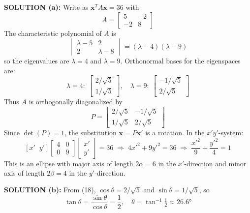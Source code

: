 \documentclass{article}
\begin{document}
\textbf{SOLUTION (a):} Write as $\mathbf{x}^T A\mathbf{x}=36$ with
\[
  A=\begin{bmatrix}5&-2\\-2&8\end{bmatrix}
\]
The characteristic polynomial of $A$ is
\[
  \begin{vmatrix}\lambda-5&2\\2&\lambda-8\end{vmatrix}=(\lambda-4)(\lambda-9)
\]
so the eigenvalues are $\lambda=4$ and $\lambda=9$. Orthonormal bases for the eigenspaces are:
\[
  \lambda=4:\;\begin{bmatrix}2/\sqrt{5}\\1/\sqrt{5}\end{bmatrix},\quad
  \lambda=9:\;\begin{bmatrix}-1/\sqrt{5}\\2/\sqrt{5}\end{bmatrix}
\]
Thus $A$ is orthogonally diagonalized by
\begin{equation}
  P=\begin{bmatrix}2/\sqrt{5}&-1/\sqrt{5}\\1/\sqrt{5}&2/\sqrt{5}\end{bmatrix} \tag{18}
\end{equation}
Since $\det(P)=1$, the substitution $\mathbf{x}=P\mathbf{x}'$ is a rotation. In the $x'y'$-system:
\[
  [x'\;\;y']\begin{bmatrix}4&0\\0&9\end{bmatrix}\begin{bmatrix}x'\\y'\end{bmatrix}=36
  \;\Rightarrow\; 4x'^2+9y'^2=36 \;\Rightarrow\; \frac{x'^2}{9}+\frac{y'^2}{4}=1
\]
This is an ellipse with major axis of length $2\alpha=6$ in the $x'$-direction and minor axis
of length $2\beta=4$ in the $y'$-direction.

\textbf{SOLUTION (b):} From (18), $\cos\theta=2/\sqrt{5}$ and $\sin\theta=1/\sqrt{5}$, so
\[
  \tan\theta = \frac{\sin\theta}{\cos\theta} = \frac{1}{2},\quad
  \theta = \tan^{-1}\tfrac{1}{2}\approx 26.6°
\]
\end{document}
